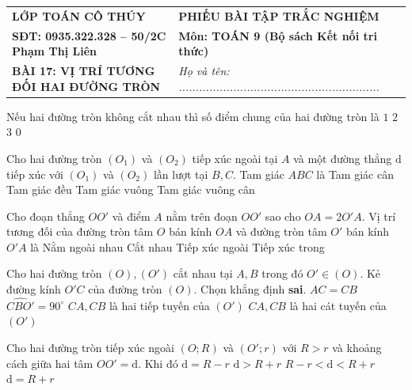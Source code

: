 \documentclass[11pt,a4paper]{article}
\begin{document}
\noindent
\begin{tabularx}{\textwidth}{|>{\centering\arraybackslash}p{6.8cm}|>{\centering\arraybackslash}X|}
\hline
\textbf{LỚP TOÁN CÔ THÚY} & \textbf{PHIẾU BÀI TẬP TRẮC NGHIỆM} \\
\textbf{SĐT: 0935.322.328 -- 50/2C Phạm Thị Liên} & \textbf{Môn: TOÁN 9 (Bộ sách Kết nối tri thức)} \\
\textbf{BÀI 17: VỊ TRÍ TƯƠNG ĐỐI HAI ĐƯỜNG TRÒN} & \textit{Họ và tên: ...........................................................} \\
\hline
\end{tabularx}

\vspace{0.3cm}

\begin{flushleft}
	{\color{blue!50!green}}
\end{flushleft}
\setcounter{ex}{0}

\begin{ex}
Nếu hai đường tròn không cắt nhau thì số điểm chung của hai đường tròn là
\choice
{$1$}
{$2$}
{$3$}
{\True $0$}
\loigiai{}
\end{ex}

\begin{ex}
Cho hai đường tròn $(O_1)$ và $(O_2)$ tiếp xúc ngoài tại $A$ và một đường thẳng $\mathrm{d}$ tiếp xúc với $(O_1)$ và $(O_2)$ lần lượt tại $B, C$. Tam giác $ABC$ là
\choice
{Tam giác cân}
{Tam giác đều}
{\True Tam giác vuông}
{Tam giác vuông cân}
\loigiai{}
\end{ex}

\begin{ex}
Cho đoạn thẳng $OO'$ và điểm $A$ nằm trên đoạn $OO'$ sao cho $OA = 2O'A$. Vị trí tương đối của đường tròn tâm $O$ bán kính $OA$ và đường tròn tâm $O'$ bán kính $O'A$ là
\choice
{Nằm ngoài nhau}
{Cắt nhau}
{\True Tiếp xúc ngoài}
{Tiếp xúc trong}
\loigiai{}
\end{ex}

\begin{ex}
Cho hai đường tròn $(O), (O')$ cắt nhau tại $A, B$ trong đó $O' \in (O)$. Kẻ đường kính $O'C$ của đường tròn $(O)$. Chọn khẳng định \textbf{sai}.
\choice
{$AC = CB$}
{$\widehat{CBO'} = 90^\circ$}
{$CA, CB$ là hai tiếp tuyến của $(O')$}
{\True $CA, CB$ là hai cát tuyến của $(O')$}
\loigiai{}
\end{ex}

\begin{ex}
Cho hai đường tròn tiếp xúc ngoài $(O; R)$ và $(O'; r)$ với $R > r$ và khoảng cách giữa hai tâm $OO' = \mathrm{d}$. Khi đó
\choice
{$\mathrm{d} = R - r$}
{$\mathrm{d} > R + r$}
{$R - r < \mathrm{d} < R + r$}
{\True $\mathrm{d} = R + r$}
\loigiai{}
\end{ex}
\end{document}
